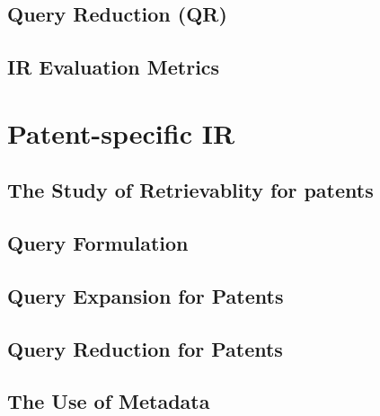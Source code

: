 \subsection{Query Reduction (QR)}

%

\subsection{IR Evaluation Metrics}



\section{Patent-specific IR}
\label{subsec:patentir}

\subsection{The Study of Retrievablity for patents}


\subsection{Query Formulation}


\subsection{Query Expansion for Patents}


\subsection{Query Reduction for Patents}


%

\subsection{The Use of Metadata}

\label{sec:metadata}

